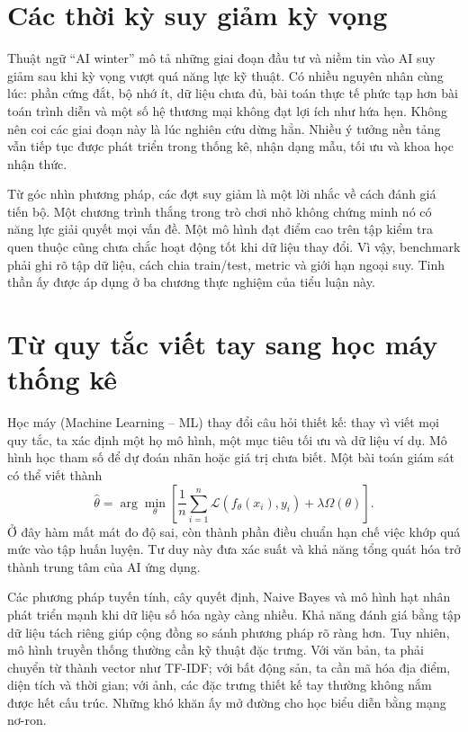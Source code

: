\documentclass[12pt,a4paper]{report}
\begin{document}
\section{Các thời kỳ suy giảm kỳ vọng}
Thuật ngữ ``AI winter'' mô tả những giai đoạn đầu tư và niềm tin vào AI suy giảm sau khi kỳ vọng vượt quá năng lực kỹ thuật. Có nhiều nguyên nhân cùng lúc: phần cứng đắt, bộ nhớ ít, dữ liệu chưa đủ, bài toán thực tế phức tạp hơn bài toán trình diễn và một số hệ thương mại không đạt lợi ích như hứa hẹn. Không nên coi các giai đoạn này là lúc nghiên cứu dừng hẳn. Nhiều ý tưởng nền tảng vẫn tiếp tục được phát triển trong thống kê, nhận dạng mẫu, tối ưu và khoa học nhận thức.

Từ góc nhìn phương pháp, các đợt suy giảm là một lời nhắc về cách đánh giá tiến bộ. Một chương trình thắng trong trò chơi nhỏ không chứng minh nó có năng lực giải quyết mọi vấn đề. Một mô hình đạt điểm cao trên tập kiểm tra quen thuộc cũng chưa chắc hoạt động tốt khi dữ liệu thay đổi. Vì vậy, benchmark phải ghi rõ tập dữ liệu, cách chia train/test, metric và giới hạn ngoại suy. Tinh thần ấy được áp dụng ở ba chương thực nghiệm của tiểu luận này.

\section{Từ quy tắc viết tay sang học máy thống kê}
Học máy (Machine Learning -- ML) thay đổi câu hỏi thiết kế: thay vì viết mọi quy tắc, ta xác định một họ mô hình, một mục tiêu tối ưu và dữ liệu ví dụ. Mô hình học tham số để dự đoán nhãn hoặc giá trị chưa biết. Một bài toán giám sát có thể viết thành
\begin{equation}\hat{\theta}=\arg\min_{\theta}\left[\frac1n\sum_{i=1}^{n}\mathcal L(f_\theta(x_i),y_i)+\lambda\Omega(\theta)\right].\end{equation}
Ở đây hàm mất mát đo độ sai, còn thành phần điều chuẩn hạn chế việc khớp quá mức vào tập huấn luyện. Tư duy này đưa xác suất và khả năng tổng quát hóa trở thành trung tâm của AI ứng dụng.

Các phương pháp tuyến tính, cây quyết định, Naive Bayes và mô hình hạt nhân phát triển mạnh khi dữ liệu số hóa ngày càng nhiều. Khả năng đánh giá bằng tập dữ liệu tách riêng giúp cộng đồng so sánh phương pháp rõ ràng hơn. Tuy nhiên, mô hình truyền thống thường cần kỹ thuật đặc trưng. Với văn bản, ta phải chuyển từ thành vector như TF-IDF; với bất động sản, ta cần mã hóa địa điểm, diện tích và thời gian; với ảnh, các đặc trưng thiết kế tay thường không nắm được hết cấu trúc. Những khó khăn ấy mở đường cho học biểu diễn bằng mạng nơ-ron.
\end{document}
